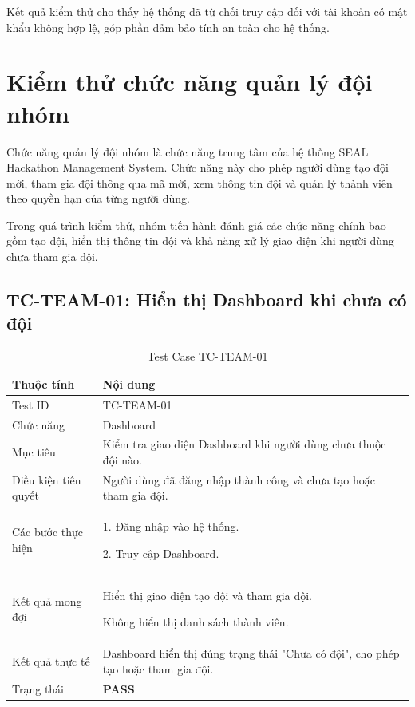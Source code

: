 Kết quả kiểm thử cho thấy hệ thống đã từ chối truy cập đối với tài khoản có mật khẩu không hợp lệ, góp phần đảm bảo tính an toàn cho hệ thống.
\section{Kiểm thử chức năng quản lý đội nhóm}

Chức năng quản lý đội nhóm là chức năng trung tâm của hệ thống SEAL Hackathon Management System. Chức năng này cho phép người dùng tạo đội mới, tham gia đội thông qua mã mời, xem thông tin đội và quản lý thành viên theo quyền hạn của từng người dùng.

Trong quá trình kiểm thử, nhóm tiến hành đánh giá các chức năng chính bao gồm tạo đội, hiển thị thông tin đội và khả năng xử lý giao diện khi người dùng chưa tham gia đội.

\subsection{TC-TEAM-01: Hiển thị Dashboard khi chưa có đội}

\begin{table}[H]
	\centering
	\caption{Test Case TC-TEAM-01}
	\label{tab:tc-team01}
	\renewcommand{\arraystretch}{1.3}
	
	\begin{tabular}{|p{4cm}|p{10cm}|}
		\hline
		\textbf{Thuộc tính} & \textbf{Nội dung} \\ \hline
		
		Test ID &
		TC-TEAM-01
		\\ \hline
		
		Chức năng &
		Dashboard
		\\ \hline
		
		Mục tiêu &
		Kiểm tra giao diện Dashboard khi người dùng chưa thuộc đội nào.
		\\ \hline
		
		Điều kiện tiên quyết &
		Người dùng đã đăng nhập thành công và chưa tạo hoặc tham gia đội.
		\\ \hline
		
		Các bước thực hiện &
		1. Đăng nhập vào hệ thống.
		
		2. Truy cập Dashboard.
		\\ \hline
		
		Kết quả mong đợi &
		Hiển thị giao diện tạo đội và tham gia đội.
		
		Không hiển thị danh sách thành viên.
		\\ \hline
		
		Kết quả thực tế &
		Dashboard hiển thị đúng trạng thái "Chưa có đội", cho phép tạo hoặc tham gia đội.
		\\ \hline
		
		Trạng thái &
		\textbf{PASS}
		\\ \hline
		
	\end{tabular}
	
\end{table}


